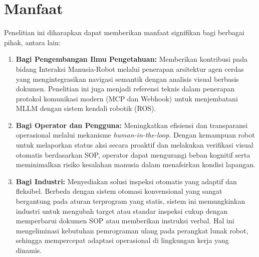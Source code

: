 \section{Manfaat}
Penelitian ini diharapkan dapat memberikan manfaat signifikan bagi berbagai pihak, antara lain:

\begin{enumerate}
    \item \textbf{Bagi Pengembangan Ilmu Pengetahuan:} Memberikan kontribusi pada bidang Interaksi Manusia-Robot melalui penerapan arsitektur agen cerdas yang mengintegrasikan navigasi semantik dengan analisis visual berbasis dokumen. Penelitian ini juga menjadi referensi teknis dalam penerapan protokol komunikasi modern (MCP dan Webhook) untuk menjembatani MLLM dengan sistem kendali robotik (ROS).
    
    \item \textbf{Bagi Operator dan Pengguna:} Meningkatkan efisiensi dan transparansi operasional melalui mekanisme \textit{human-in-the-loop}. Dengan kemampuan robot untuk melaporkan status aksi secara proaktif dan melakukan verifikasi visual otomatis berdasarkan SOP, operator dapat mengurangi beban kognitif serta meminimalkan risiko kesalahan manusia dalam menafsirkan kondisi lapangan.
    
    \item \textbf{Bagi Industri:} Menyediakan solusi inspeksi otomatis yang adaptif dan fleksibel. Berbeda dengan sistem otomasi konvensional yang sangat bergantung pada aturan terprogram yang statis, sistem ini memungkinkan industri untuk mengubah target atau standar inspeksi cukup dengan memperbarui dokumen SOP atau memberikan instruksi verbal. Hal ini mengeliminasi kebutuhan pemrograman ulang pada perangkat lunak robot, sehingga mempercepat adaptasi operasional di lingkungan kerja yang dinamis.
\end{enumerate}
